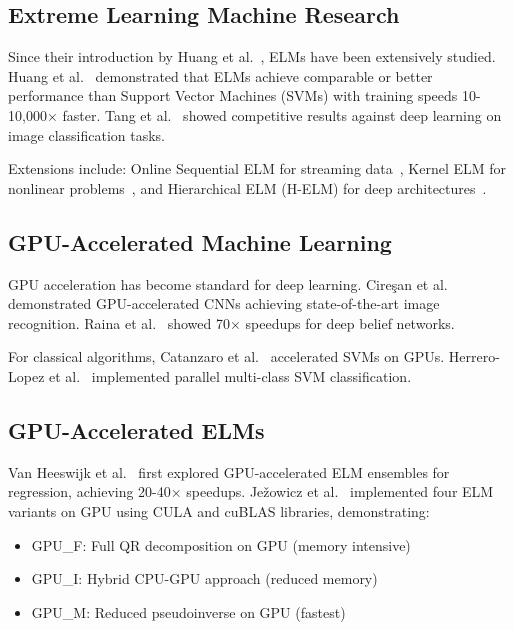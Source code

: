 \documentclass[conference]{IEEEtran}
\begin{document}
\subsection{Extreme Learning Machine Research}

Since their introduction by Huang et al.~\cite{huang2006elm}, ELMs have been extensively studied. Huang et al.~\cite{huang2012elm} demonstrated that ELMs achieve comparable or better performance than Support Vector Machines (SVMs) with training speeds 10-10,000× faster. Tang et al.~\cite{tang2016elm} showed competitive results against deep learning on image classification tasks.

Extensions include: Online Sequential ELM for streaming data~\cite{liang2006oselm}, Kernel ELM for nonlinear problems~\cite{huang2012kernel}, and Hierarchical ELM (H-ELM) for deep architectures~\cite{tang2013helms}.

\subsection{GPU-Accelerated Machine Learning}

GPU acceleration has become standard for deep learning. Cireşan et al.~\cite{ciresan2010deep} demonstrated GPU-accelerated CNNs achieving state-of-the-art image recognition. Raina et al.~\cite{raina2009gpu} showed 70× speedups for deep belief networks.

For classical algorithms, Catanzaro et al.~\cite{catanzaro2008svm} accelerated SVMs on GPUs. Herrero-Lopez et al.~\cite{herrero2010parallel} implemented parallel multi-class SVM classification.

\subsection{GPU-Accelerated ELMs}

Van Heeswijk et al.~\cite{heeswijk2011gpu} first explored GPU-accelerated ELM ensembles for regression, achieving 20-40× speedups. Ježowicz et al.~\cite{jezowicz2015gpu} implemented four ELM variants on GPU using CULA and cuBLAS libraries, demonstrating:

\begin{itemize}
\item GPU\_F: Full QR decomposition on GPU (memory intensive)
\item GPU\_I: Hybrid CPU-GPU approach (reduced memory)
\item GPU\_M: Reduced pseudoinverse on GPU (fastest)
\end{itemize}
\end{document}
